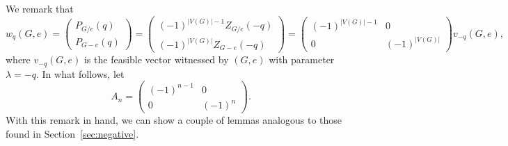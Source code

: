 \documentclass[A4paper,reqno,oneside,12pt]{amsart}
\theoremstyle{plain}
\theoremstyle{definition}
\begin{document}
We remark that
\begin{equation}\label{eq:feasible-to-attainable}
    w_q(G,e) = \begin{pmatrix}
P_{G/e}(q)\\[2pt]
P_{G-e}(q)
\end{pmatrix}= \begin{pmatrix}
(-1)^{|V(G)|-1}Z_{G/e}(-q)\\
(-1)^{|V(G)|}Z_{G-e}(-q)
\end{pmatrix} = \begin{pmatrix}
    (-1)^{|V(G)|-1}&0\\0&(-1)^{|V(G)|}
\end{pmatrix}v_{-q}(G,e),
 \end{equation}
where $v_{-q}(G,e)$ is the feasible vector witnessed by $(G,e)$ with parameter $\lambda = -q$. In what follows, let
\begin{equation*}
        A_n =\begin{pmatrix}
            (-1)^{n-1}&0\\0&(-1)^n
        \end{pmatrix}.
    \end{equation*}
With this remark in hand, we can show a couple of lemmas analogous to those found in Section~\ref{sec:negative}. 
\end{document}
